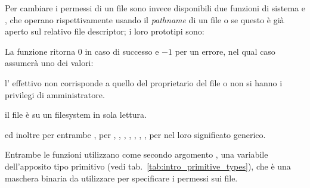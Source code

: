 Per cambiare i permessi di un file sono invece disponibili due funzioni di
sistema  e , che operano rispettivamente usando il
\textit{pathname} di un file o se questo è già aperto sul relativo file
descriptor; i loro prototipi sono:

\begin{funcproto}{

}

{La funzione ritorna $0$ in caso di successo e $-1$ per un errore, nel qual
  caso  assumerà uno dei valori: 
  \begin{errlist}
  \item[\errcode{EPERM}] l' effettivo non corrisponde a quello del
    proprietario del file o non si hanno i privilegi di amministratore.
  \item[\errcode{EROFS}] il file è su un filesystem in sola lettura.
  \end{errlist}
  ed inoltre per entrambe , per  ,
  , , , ,
  , , per   nel loro
  significato generico.}
\end{funcproto}


Entrambe le funzioni utilizzano come secondo argomento , una
variabile dell'apposito tipo primitivo  (vedi
tab.~\ref{tab:intro_primitive_types}), che è una maschera binaria da
utilizzare per specificare i permessi sui file.


